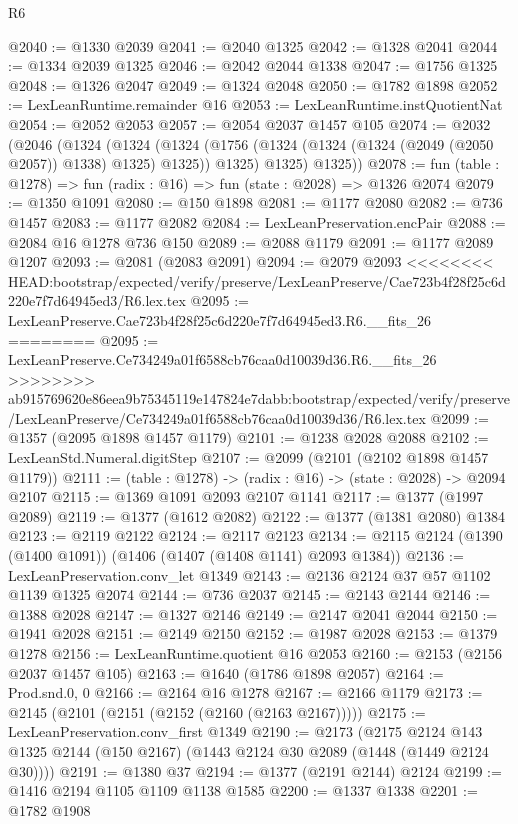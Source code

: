 \begin{lexlean}{R6}
\begin{coremodule}
{{{{{{{{{{{{{{{{{{{{{{{{{{{{{{{{{{{{{{{{{{{{{{{{{{@2040 := @1330 @2039
@2041 := @2040 @1325
@2042 := @1328 @2041
@2044 := @1334 @2039 @1325
@2046 := @2042 @2044 @1338
@2047 := @1756 @1325
@2048 := @1326 @2047
@2049 := @1324 @2048
@2050 := @1782 @1898
@2052 := LexLeanRuntime.remainder @16
@2053 := LexLeanRuntime.instQuotientNat
@2054 := @2052 @2053
@2057 := @2054 @2037 @1457 @105
@2074 := @2032
    (@2046
      (@1324
        (@1324
          (@1324 (@1756 (@1324 (@1324 (@1324 (@2049 (@2050 @2057)) @1338) @1325) @1325)) @1325)
          @1325)
        @1325))
@2078 := fun (table : @1278) => fun (radix : @16) => fun (state : @2028) => @1326 @2074
@2079 := @1350 @1091
@2080 := @150 @1898
@2081 := @1177 @2080
@2082 := @736 @1457
@2083 := @1177 @2082
@2084 := LexLeanPreservation.encPair
@2088 := @2084 @16 @1278 @736 @150
@2089 := @2088 @1179
@2091 := @1177 @2089 @1207
@2093 := @2081 (@2083 @2091)
@2094 := @2079 @2093
<<<<<<<< HEAD:bootstrap/expected/verify/preserve/LexLeanPreserve/Cae723b4f28f25c6d220e7f7d64945ed3/R6.lex.tex
@2095 := LexLeanPreserve.Cae723b4f28f25c6d220e7f7d64945ed3.R6.__fits_26
========
@2095 := LexLeanPreserve.Ce734249a01f6588cb76caa0d10039d36.R6.__fits_26
>>>>>>>> ab915769620e86eea9b75345119e147824e7dabb:bootstrap/expected/verify/preserve/LexLeanPreserve/Ce734249a01f6588cb76caa0d10039d36/R6.lex.tex
@2099 := @1357 (@2095 @1898 @1457 @1179)
@2101 := @1238 @2028 @2088
@2102 := LexLeanStd.Numeral.digitStep
@2107 := @2099 (@2101 (@2102 @1898 @1457 @1179))
@2111 := (table : @1278) -> (radix : @16) -> (state : @2028) -> @2094 @2107
@2115 := @1369 @1091 @2093 @2107 @1141
@2117 := @1377 (@1997 @2089)
@2119 := @1377 (@1612 @2082)
@2122 := @1377 (@1381 @2080) @1384
@2123 := @2119 @2122
@2124 := @2117 @2123
@2134 := @2115 @2124 (@1390 (@1400 @1091)) (@1406 (@1407 (@1408 @1141) @2093 @1384))
@2136 := LexLeanPreservation.conv_let @1349
@2143 := @2136 @2124 @37 @57 @1102 @1139 @1325 @2074
@2144 := @736 @2037
@2145 := @2143 @2144
@2146 := @1388 @2028
@2147 := @1327 @2146
@2149 := @2147 @2041 @2044
@2150 := @1941 @2028
@2151 := @2149 @2150
@2152 := @1987 @2028
@2153 := @1379 @1278
@2156 := LexLeanRuntime.quotient @16 @2053
@2160 := @2153 (@2156 @2037 @1457 @105)
@2163 := @1640 (@1786 @1898 @2057)
@2164 := Prod.snd.{0, 0}
@2166 := @2164 @16 @1278
@2167 := @2166 @1179
@2173 := @2145 (@2101 (@2151 (@2152 (@2160 (@2163 @2167)))))
@2175 := LexLeanPreservation.conv_first @1349
@2190 := @2173
    (@2175 @2124 @143 @1325 @2144 (@150 @2167) (@1443 @2124 @30 @2089 (@1448 (@1449 @2124 @30))))
@2191 := @1380 @37
@2194 := @1377 (@2191 @2144) @2124
@2199 := @1416 @2194 @1105 @1109 @1138 @1585
@2200 := @1337 @1338
@2201 := @1782 @1908
}}}}}}}}}}}}}}}}}}}}}}}}}}}}}}}}}}}}}}}}}}}}}}}}}}
\end{coremodule}
\end{lexlean}
